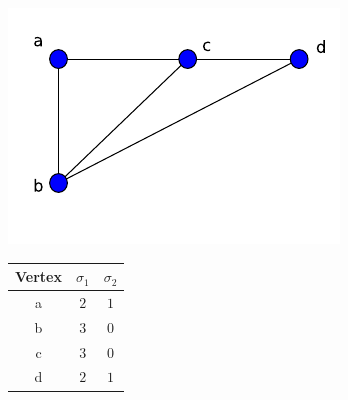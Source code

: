 \documentclass[10pt,a4paper]{article}
\theoremstyle{plain}
\theoremstyle{definition}
\begin{document}
             \begin{figure}[H]
             	\centering
             	\begin{minipage}[b]{.30\textwidth}
             		\centering
             		\vspace{0pt}
             		\includegraphics[width=\textwidth]{images/sample-lap2.pdf}
             		\label{spanning}
             	\end{minipage}
             	\hfill
             	\begin{minipage}[b]{.64\textwidth}
             		\centering
             		\vspace{0pt}
             		\setlength{\tabcolsep}{15pt}
             		\renewcommand{\arraystretch}{1.2}
             		\begin{tabular}{|c|c|c|}
             			\hline 
             			Vertex &$\sigma_1$ & $\sigma_2$ \\
             			\hline
             			a & $2$ & $1$ \\
             			b & $3$ & $0$ \\
             			c & $3$ & $0$ \\
             			d & $2$ & $1$ \\
             			\hline
             		\end{tabular}
             	\end{minipage}
             \end{figure}
            
\end{document}
